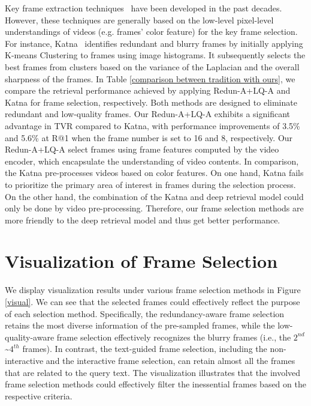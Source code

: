 \documentclass[11pt]{article}
\begin{document}
Key frame extraction techniques~\cite{chang1999efficient, divakaran2002motion, chang2003content} have been developed in the past decades.
However, these techniques are generally based on the low-level pixel-level understandings of videos (e.g. frames' color feature) for the key frame selection. 
For instance, Katna~\cite{Katna} identifies redundant and blurry frames by initially applying K-means Clustering to frames using image histograms. 
It subsequently selects the best frames from clusters based on the variance of the Laplacian and the overall sharpness of the frames. 
In Table \ref{comparison between tradition with ours}, we compare the retrieval performance achieved by applying Redun-A+LQ-A and Katna for frame selection, respectively. Both methods are designed to eliminate redundant and low-quality frames.
Our Redun-A+LQ-A exhibits a significant advantage in TVR compared to Katna, with performance improvements of 3.5\% and 5.6\% at R@1 when the frame number is set to 16 and 8, respectively.
Our Redun-A+LQ-A select frames using frame features computed by the video encoder, which encapsulate the understanding of video contents. 
In comparison, the Katna pre-processes videos based on color features. 
On one hand, Katna fails to prioritize the primary area of interest in frames during the selection process. 
On the other hand, the combination of the Katna and deep retrieval model could only be done by video pre-processing. 
Therefore, our frame selection methods are more friendly to the deep retrieval model and thus get better performance.

\section{Visualization of Frame Selection}
\label{visualization}
We display visualization results under various frame selection methods in Figure \ref{visual}.
We can see that the selected frames could effectively reflect the purpose of each selection method.
Specifically, the redundancy-aware frame selection retains the most diverse information of the pre-sampled frames, while the low-quality-aware frame selection effectively recognizes the blurry frames (i.e., the $2^{nd}$ \textasciitilde $4^{th}$ frames).
In contrast, the text-guided frame selection, including the non-interactive and the interactive frame selection, can retain almost all the frames that are related to the query text.
The visualization illustrates that the involved frame selection methods could effectively filter the inessential frames based on the respective criteria.
\end{document}
